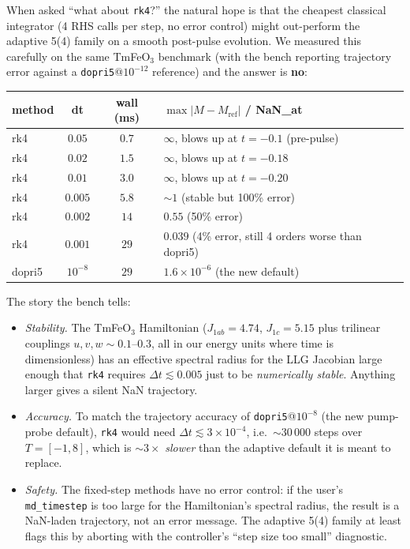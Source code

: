 \documentclass[11pt,letterpaper]{article}
\begin{document}
When asked ``what about \texttt{rk4}?'' the natural hope is that
the cheapest classical integrator (4 RHS calls per step, no error
control) might out-perform the adaptive 5(4) family on a smooth
post-pulse evolution.  We measured this carefully on the same
TmFeO$_3$ benchmark (with the bench reporting trajectory error
against a \texttt{dopri5}@$10^{-12}$ reference) and the answer is
\textbf{no}:

\begin{center}
\small
\begin{tabular}{lccp{6cm}}
\hline
\textbf{method} & \textbf{dt} & \textbf{wall (ms)} & \textbf{$\max |M-M_{\text{ref}}|$ \quad / \quad NaN\_at} \\
\hline
rk4 & $0.05$    & $0.7$  & $\infty$, blows up at $t=-0.1$ (pre-pulse) \\
rk4 & $0.02$    & $1.5$  & $\infty$, blows up at $t=-0.18$ \\
rk4 & $0.01$    & $3.0$  & $\infty$, blows up at $t=-0.20$ \\
rk4 & $0.005$   & $5.8$  & $\sim 1$ (stable but 100\% error) \\
rk4 & $0.002$   & $14$   & $0.55$ (50\% error) \\
rk4 & $0.001$   & $29$   & $0.039$ (4\% error, still 4 orders worse than dopri5) \\
\hline
dopri5 & $10^{-8}$ & $29$ & $1.6 \times 10^{-6}$ (the new default) \\
\hline
\end{tabular}
\end{center}

The story the bench tells:

\begin{itemize}
  \item \emph{Stability.}  The TmFeO$_3$ Hamiltonian
        ($J_{1ab} = 4.74$, $J_{1c} = 5.15$ plus trilinear
        couplings $u, v, w \sim 0.1$--$0.3$, all in our energy units
        where time is dimensionless) has an effective spectral
        radius for the LLG Jacobian large enough that
        \texttt{rk4} requires $\Delta t \lesssim 0.005$ just to be
        \emph{numerically stable}.  Anything larger gives a
        silent NaN trajectory.
  \item \emph{Accuracy.}  To match the trajectory accuracy of
        \texttt{dopri5}@$10^{-8}$ (the new pump-probe default),
        \texttt{rk4} would need $\Delta t \lesssim 3 \times 10^{-4}$,
        i.e.\ $\sim 30\,000$ steps over $T = [-1, 8]$, which is
        $\sim 3 \times$ \emph{slower} than the adaptive default it is
        meant to replace.
  \item \emph{Safety.}  The fixed-step methods have no error
        control: if the user's \texttt{md\_timestep} is too large
        for the Hamiltonian's spectral radius, the result is a
        NaN-laden trajectory, not an error message.  The adaptive
        5(4) family at least flags this by aborting with the
        controller's ``step size too small'' diagnostic.
\end{itemize}
\end{document}
